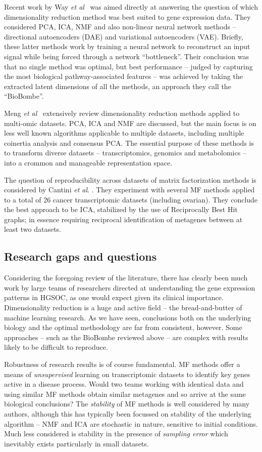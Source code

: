 \documentclass[tikz, 11pt,a4paper,oneside,fleqn]{article}
\newcommand{\etal}{{\em et al\/}}
\begin{document}
Recent work by Way \etal\ \cite{WayGregory2019} was aimed directly at answering the question of which dimensionality reduction method was best suited to gene expression data.  They considered PCA, ICA, NMF and also non-linear neural network methods -- directional autoencoders (DAE)  and variational autoencoders (VAE).  Briefly, these latter methods work by training a neural network to reconstruct an input signal while being forced through a network ``bottleneck''.   Their conclusion was that no single method was optimal, but best performance -- judged by capturing the most biological pathway-associated features -- was achieved by taking the extracted latent dimensions of all the methods, an approach they call the ``BioBombe''.

Meng \etal\ \cite{Meng2016} extensively review dimensionality reduction methods applied to multi-omic datasets.   PCA, ICA and NMF are discussed, but the main focus is on less well known algorithms applicable to multiple datasets, including multiple coinertia analysis and consensus PCA.  The essential purpose of these methods is to transform diverse datasets -- transcriptomics, genomics and metabolomics  -- into a crommon and manageable representation space.

The question of reproducibility across datasets of matrix factorization methods is considered by Cantini \etal. \cite{Cantini2019}.  They experiment with several MF methods applied to a total of 26 cancer transcriptomic datasets (including ovarian).  They conclude the best approach to be ICA, stabilized by the use of Reciprocally Best Hit graphs; in essence requiring reciprocal identification of metagenes between at least two datasets.

\subsection{Research gaps and questions}
Considering the foregoing review of the literature, there has clearly been much work by large teams of researchers directed at understanding the gene expression patterns in HGSOC, as one would expect given its clinical importance.  
Dimensionality reduction is a huge and active field -- the bread-and-butter of machine learning research. 
As we have seen, conclusions both on the underlying biology and the optimal methodology are far from consistent, however.   Some approaches -- such as the BioBombe reviewed above -- are complex with results likely to be difficult to reproduce.   

Robustness of research results is of course fundamental.  MF methods offer a means of \emph{unsupervised} learning on transcriptomic datasets to identify key genes active in a disease process.  Would two teams working with identical data and using similar MF methods obtain similar metagenes and so arrive at the same biological conclusions?   The \emph{stability} of MF methods is well considered by many authors, although this has typically been focussed on stability of the underlying algorithm -- NMF and ICA are stochastic in nature, sensitive to initial conditions.   Much less considered is stability in the presence of \emph{sampling error} which inevitably exists particularly in small datasets.
\end{document}

